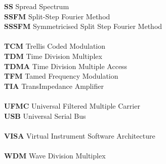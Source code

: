 \begin{multicols}{2}
\begin{tabbing}
\textbf{SS}			\>	Spread Spectrum									\\
\textbf{SSFM}		\>	Split-Step Fourier Method						\\
\textbf{SSSFM}		\>	Symmetricised Split Step Fourier Method			\\
\\
\textbf{TCM}		\>	Trellis Coded Modulation						\\
\textbf{TDM}		\>	Time Division Multiplex							\\
\textbf{TDMA}		\>	Time Division Multiple Access					\\
\textbf{TFM}		\>	Tamed Frequency Modulation						\\
\textbf{TIA}		\>	TransImpedance Amplifier						\\
\\
\textbf{UFMC}		\>	Universal Filtered Multiple Carrier				\\
\textbf{USB}		\>	Universal Serial Bus							\\
\\
\textbf{VISA}		\>	Virtual Instrument Software Architecture		\\
\\
\textbf{WDM}		\>	Wave Division Multiplex							\\
\end{tabbing}
%
\end{multicols}
\normalsize

